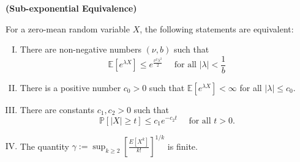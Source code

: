 \documentclass{article}
\newcommand{\bfs}[1]{\textbf{({#1})}}
\begin{document}
\begin{thma}{\bfs{Sub-exponential Equivalence}}

\end{thma}For a zero-mean random variable $X$, the following statements are equivalent:
\begin{enumerate}[(I)]
    \item There are non-negative numbers $(\nu, b)$ such that
$$
\mathbb{E}\left[e^{\lambda X}\right] \leq e^{\frac{\nu^2\lambda^2}{2}} \quad \text { for all }|\lambda|<\frac{1}{b}
$$
\item There is a positive number $c_{0}>0$ such that $\mathbb{E}\left[e^{\lambda X}\right]<\infty$ for all $|\lambda| \leq c_{0}$.
\item There are constants $c_{1}, c_{2}>0$ such that
$$
\mathbb{P}[|X| \geq t] \leq c_{1} e^{-c_{2} t} \quad \text { for all } t>0 .$$
\item The quantity $\gamma:=\sup _{k \geq 2}\left[\frac{E\left[X^{k}\right]}{k !}\right]^{1 / k}$ is finite.
\end{enumerate}
\end{document}
